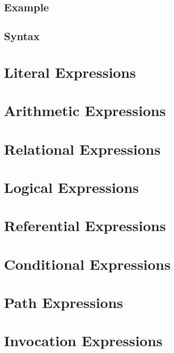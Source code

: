\documentclass[a4paper,oneside,12pt, extrafontsizes]{memoir}
\begin{document}
    \section{Example}
    

    \section{Syntax}
    

  \chapter{Literal Expressions}
  \label{ch:literals}
  

  \chapter{Arithmetic Expressions}
  \label{ch:arithmetic}
  

  \chapter{Relational Expressions}
  \label{ch:relational}
  

  \chapter{Logical Expressions}
  \label{ch:logical}
  

  \chapter{Referential Expressions}
  \label{ch:referential}
  

  \chapter{Conditional Expressions}
  \label{ch:conditionals}
  

  \chapter{Path Expressions}
  \label{ch:paths}
  

  \chapter{Invocation Expressions}
  \label{ch:invocations}
  
\end{document}
